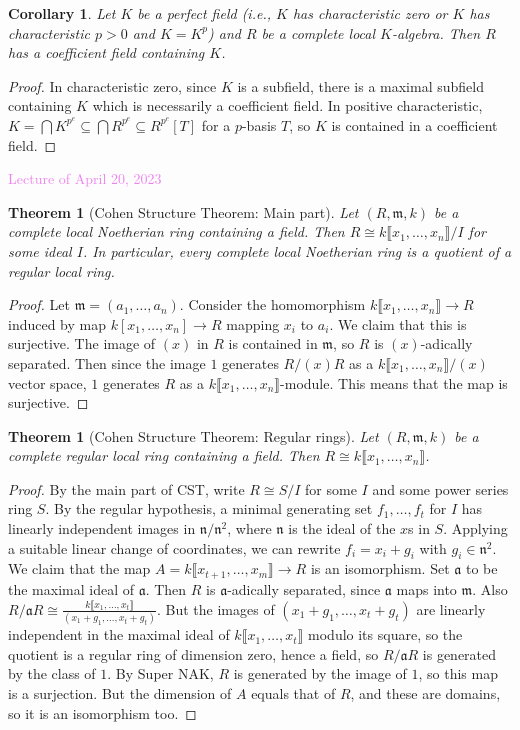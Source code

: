 \documentclass{amsart}[12pt]
\newcommand{\Apr}[1]{\textcolor{violet}{Lecture of April #1, 2023}}
\newcommand{\fm}{{\mathfrak m}}
\newcommand{\fa}{{\mathfrak a}}
\newcommand{\fn}{{\mathfrak n}}
\numberwithin{equation}{section}
\theoremstyle{plain} %
\newtheorem{thm}[equation]{Theorem}
\newtheorem{cor}[equation]{Corollary}
\theoremstyle{definition}
\theoremstyle{remark}
\begin{document}
\begin{cor} Let $K$ be a perfect field (i.e., $K$ has characteristic zero or $K$ has characteristic $p>0$ and $K=K^p$) and $R$ be a complete local $K$-algebra. Then $R$ has a coefficient field containing $K$.
\end{cor}
\begin{proof} In characteristic zero, since $K$ is a subfield, there is a maximal subfield containing $K$ which is necessarily a coefficient field. In positive characteristic, $K = \bigcap K^{p^e} \subseteq \bigcap R^{p^e} \subseteq R^{p^e}[T]$ for a $p$-basis $T$, so $K$ is contained in a coefficient field.
\end{proof}

\Apr{20}

\begin{thm}[Cohen Structure Theorem: Main part] Let $(R,\fm,k)$ be a complete local Noetherian ring containing a field. Then $R\cong k\llbracket x_1,\dots,x_n\rrbracket / I$ for some ideal $I$. In particular, every complete local Noetherian ring is a quotient of a regular local ring.
\end{thm}
\begin{proof}
Let $\fm=(a_1,\dots,a_n)$. Consider the homomorphism $k\llbracket x_1,\dots,x_n\rrbracket \to R$ induced by map $k[x_1,\dots,x_n] \to R$ mapping $x_i$ to $a_i$. We claim that this is surjective. The image of $(x)$ in $R$ is contained in $\fm$, so $R$ is $(x)$-adically separated. Then since the image $1$ generates $R/(x)R$ as a $k\llbracket x_1,\dots,x_n\rrbracket/(x)$ vector space, $1$ generates $R$ as a $k\llbracket x_1,\dots,x_n\rrbracket$-module. This means that the map is surjective.
\end{proof}


\begin{thm}[Cohen Structure Theorem: Regular rings] Let $(R,\fm,k)$ be a complete regular local ring containing a field. Then $R\cong k\llbracket x_1,\dots,x_n\rrbracket$.
\end{thm}
\begin{proof} By the main part of CST, write $R\cong S/I$ for some $I$ and some power series ring $S$. By the regular hypothesis, a minimal generating set $f_1,\dots,f_t$ for $I$ has linearly independent images in $\fn/\fn^2$, where $\fn$ is the ideal of the $x$s in $S$. Applying a suitable linear change of coordinates, we can rewrite $f_i=x_i + g_i$ with $g_i\in \fn^2$. We claim that the map $A=k\llbracket x_{t+1},\dots,x_m\rrbracket \to R$ is an isomorphism. Set $\fa$ to be the maximal ideal of $\fa$. Then $R$ is $\fa$-adically separated, since $\fa$ maps into $\fm$. Also $R/\fa R\cong \frac{k\llbracket x_1,\dots,x_t\rrbracket}{(x_1+g_1,\dots,x_t+g_t)}$. But the images of $(x_1+g_1,\dots,x_t+g_t)$ are linearly independent in the maximal ideal of $k\llbracket x_1,\dots,x_t\rrbracket$ modulo its square, so the quotient is a regular ring of dimension zero, hence a field, so $R/\fa R$ is generated by the class of $1$. By Super NAK, $R$ is generated by the image of $1$, so this map is a surjection. But the dimension of $A$ equals that of $R$, and these are domains, so it is an isomorphism too.
\end{proof}
\end{document}
